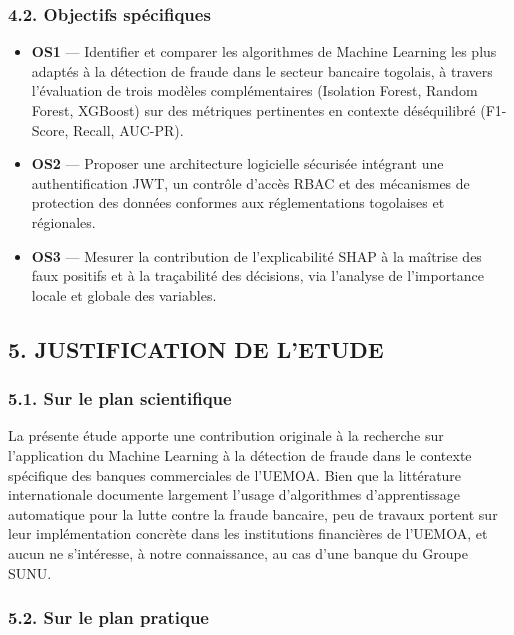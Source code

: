 \documentclass[
  12pt,
]{article}
\providecommand{\tightlist}{%
  \setlength{\itemsep}{0pt}\setlength{\parskip}{0pt}}
\begin{document}
\subsubsection{4.2. Objectifs
spécifiques}\label{objectifs-spuxe9cifiques}

\begin{itemize}
\tightlist
\item
  \textbf{OS1} — Identifier et comparer les algorithmes de Machine
  Learning les plus adaptés à la détection de fraude dans le secteur
  bancaire togolais, à travers l’évaluation de trois modèles
  complémentaires (Isolation Forest, Random Forest, XGBoost) sur des
  métriques pertinentes en contexte déséquilibré (F1-Score, Recall,
  AUC-PR).
\item
  \textbf{OS2} — Proposer une architecture logicielle sécurisée
  intégrant une authentification JWT, un contrôle d’accès RBAC et des
  mécanismes de protection des données conformes aux réglementations
  togolaises et régionales.
\item
  \textbf{OS3} — Mesurer la contribution de l’explicabilité SHAP à la
  maîtrise des faux positifs et à la traçabilité des décisions, via
  l’analyse de l’importance locale et globale des variables.
\end{itemize}

\subsection{5. JUSTIFICATION DE L’ETUDE}\label{justification-de-letude}

\subsubsection{5.1. Sur le plan
scientifique}\label{sur-le-plan-scientifique}

La présente étude apporte une contribution originale à la recherche sur
l’application du Machine Learning à la détection de fraude dans le
contexte spécifique des banques commerciales de l’UEMOA. Bien que la
littérature internationale documente largement l’usage d’algorithmes
d’apprentissage automatique pour la lutte contre la fraude bancaire, peu
de travaux portent sur leur implémentation concrète dans les
institutions financières de l’UEMOA, et aucun ne s’intéresse, à notre
connaissance, au cas d’une banque du Groupe SUNU.

\subsubsection{5.2. Sur le plan pratique}\label{sur-le-plan-pratique}
\end{document}
